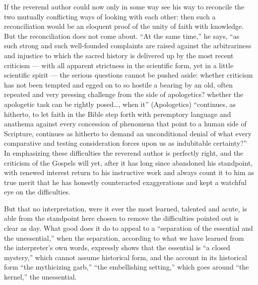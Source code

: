 \documentclass[12pt,a4paper,openany]{book}
\newcommand{\opage}[1]{\marginnote{\footnotesize\textit{[#1]}}}
\begin{document}
If the reverend author could now only in
some way see his way to reconcile the two mutually
conflicting ways of looking with each other: then such
a reconciliation would be an eloquent proof of the unity of faith
with knowledge. But the reconciliation does not come about. ``At the
same time,'' he says, ``as such strong and
such well-founded complaints are raised against the arbitrariness and injustice
to which the sacred history is delivered up
by the most recent criticism --- with all apparent strictness
in the scientific form, yet in a little scientific
spirit --- the serious questions cannot be pushed
aside: whether criticism has not been tempted and egged on to
so hostile a bearing by an old, often repeated and
very pressing challenge from the side of apologetics?
whether the apologetic task can be rightly posed\dots{},
when it'' (Apologetics) ``continues, as hitherto, to let   %
faith in the Bible step forth with peremptory language and anathema against
every concession of phenomena that point to a
human side of Scripture, continues as hitherto to
demand an unconditional denial of what every comparative
and testing consideration forces upon us as
indubitable certainty?'' In emphasizing these difficulties
the reverend author is perfectly right, and the criticism of the Gospels
will yet, after it has long since abandoned his
standpoint, with renewed interest return to his
instructive work and always count it to him as true
\setcounter{footnote}{0}%
\opage{322}merit that he has honestly counteracted exaggerations
and kept a watchful eye on the difficulties.

But that no interpretation, were it ever the most learned,
talented and acute, is able from the standpoint
here chosen to remove the difficulties pointed out
is clear as day. What good does it do
to appeal to a ``separation of the essential
and the unessential,'' when the separation, according to what we have
learned from the interpreter's own words, expressly shows that the
essential is ``a closed mystery,'' which cannot
assume historical form, and the account in its historical
form ``the mythicizing garb,'' ``the embellishing
setting,'' which goes around ``the kernel,'' the
unessential.
\end{document}
